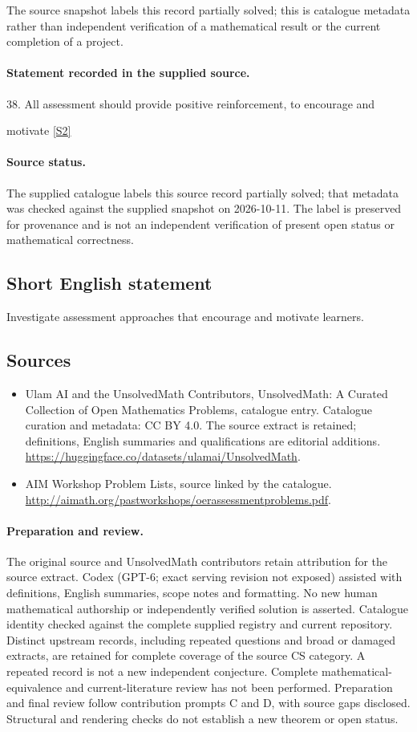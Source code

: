 \documentclass[11pt]{article}
\begin{document}
The source snapshot labels this record partially solved; this is catalogue metadata rather than independent verification of a mathematical result or the current completion of a project.
\paragraph{Statement recorded in the supplied source.}
38. All assessment should provide positive reinforcement, to encourage and

motivate \href{http://aimath.org/pastworkshops/oerassessmentproblems.pdf}{[S2]}
\paragraph{Source status.}
The supplied catalogue labels this source record partially solved; that metadata was checked against the supplied snapshot on 2026-10-11. The label is preserved for provenance and is not an independent verification of present open status or mathematical correctness.
\subsection{Short English statement}
Investigate assessment approaches that encourage and motivate learners.
\subsection{Sources}
\begin{itemize}
\item[S1] Ulam AI and the UnsolvedMath Contributors, UnsolvedMath: A Curated Collection of Open Mathematics Problems, catalogue entry. Catalogue curation and metadata: CC BY 4.0. The source extract is retained; definitions, English summaries and qualifications are editorial additions.
\url{https://huggingface.co/datasets/ulamai/UnsolvedMath}.
\item[S2] AIM Workshop Problem Lists, source linked by the catalogue.
\url{http://aimath.org/pastworkshops/oerassessmentproblems.pdf}.
\end{itemize}
\paragraph{Preparation and review.}
The original source and UnsolvedMath contributors retain attribution for the source extract. Codex (GPT-6; exact serving revision not exposed) assisted with definitions, English summaries, scope notes and formatting. No new human mathematical authorship or independently verified solution is asserted. Catalogue identity checked against the complete supplied registry and current repository. Distinct upstream records, including repeated questions and broad or damaged extracts, are retained for complete coverage of the source CS category. A repeated record is not a new independent conjecture. Complete mathematical-equivalence and current-literature review has not been performed. Preparation and final review follow contribution prompts C and D, with source gaps disclosed. Structural and rendering checks do not establish a new theorem or open status.
\label{end:statement}
\end{document}
